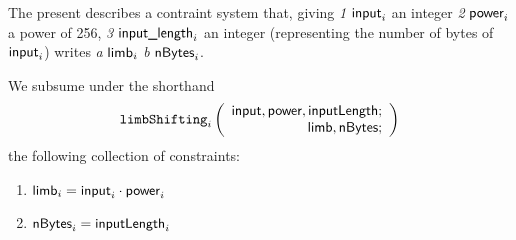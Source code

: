 The present describes a contraint system that, giving 
\emph{1} $\textsf{input}_{i}$ an integer
\emph{2} $\textsf{power}_{i}$ a power of 256,
\emph{3} $\textsf{input\_length}_{i}$ an integer (representing the number of bytes of $\textsf{input}_{i}$) writes 
\emph{a} $\textsf{limb}_{i}$
\emph{b} $\textsf{nBytes}_{i}$.

\noindent We subsume under the shorthand
\[
	\texttt{limbShifting}_{i}
	\left(
	\begin{array}{r}
		\textsf{input},
		\textsf{power},
		\textsf{inputLength}; \\
		\textsf{limb},
		\textsf{nBytes}; \\
	\end{array}
	\right)
\]
the following collection of constraints:
\begin{enumerate}
	\item $\textsf{limb}_{i}=\textsf{input}_{i} \cdot \textsf{power}_{i}$
	\item $\textsf{nBytes}_{i} = \textsf{inputLength}_{i}$
\end{enumerate}